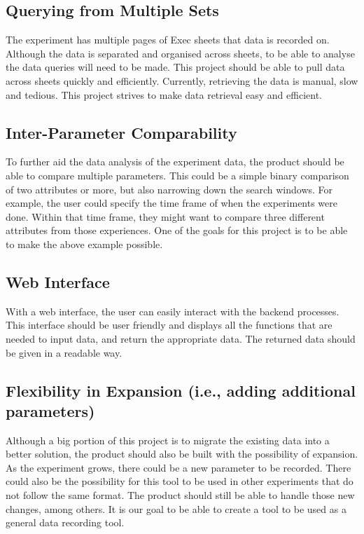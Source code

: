 \documentclass{article}
\begin{document}
\subsection*{Querying from Multiple Sets}
The experiment has multiple pages of Exec sheets that data is recorded on. Although the data is separated and organised across sheets, to be able to analyse the data queries will need to be made.
This project should be able to pull data across sheets quickly and efficiently. Currently, retrieving the data is manual, slow and tedious.
This project strives to make data retrieval easy and efficient.  


\subsection*{Inter-Parameter Comparability}
To further aid the data analysis of the experiment data, the product should be able to compare multiple parameters.
This could be a simple binary comparison of two attributes or more, but also narrowing down the search windows.
For example, the user could specify the time frame of when the experiments were done. Within that time frame, they might want to compare three different attributes from those experiences.
One of the goals for this project is to be able to make the above example possible.


\subsection*{Web Interface}
With a web interface, the user can easily interact with the backend processes.
This interface should be user friendly and displays all the functions that are needed to input data, and return the appropriate data.
The returned data should be given in a readable way.


\subsection*{Flexibility in Expansion (i.e., adding additional parameters)}
Although a big portion of this project is to migrate the existing data into a better solution, the product should also be
built with the possibility of expansion. As the experiment grows, there could be a new parameter to be recorded.
There could also be the possibility for this tool to be used in other experiments that do not follow the same format. The product should still be able to handle those new changes, among others.
It is our goal to be able to create a tool to be used as a general data recording tool.
\end{document}
